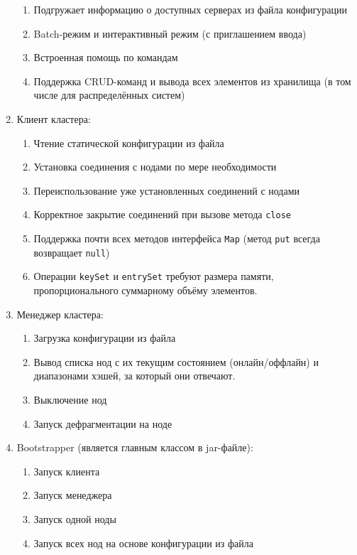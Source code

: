 \documentclass[a4paper]{article}
\renewcommand{\t}{\texttt}
\begin{document}
\begin{enumerate}
    \begin{enumerate}
    \item Подгружает информацию о доступных серверах из файла конфигурации
    \item Batch-режим и интерактивный режим (с приглашением ввода)
    \item Встроенная помощь по командам
    \item Поддержка CRUD-команд и вывода всех элементов из хранилища (в том числе для распределённых систем)
    \end{enumerate}
  \item Клиент кластера:
    \begin{enumerate}
    \item Чтение статической конфигурации из файла
    \item Установка соединения с нодами по мере необходимости
    \item Переиспользование уже установленных соединений с нодами
    \item Корректное закрытие соединений при вызове метода \t{close}
    \item Поддержка почти всех методов интерфейса \t{Map} (метод \t{put} всегда возвращает \t{null})
    \item Операции \t{keySet} и \t{entrySet} требуют размера памяти, пропорционального суммарному объёму
          элементов.
    \end{enumerate}
  \item Менеджер кластера:
    \begin{enumerate}
    \item Загрузка конфигурации из файла
    \item Вывод списка нод с их текущим состоянием (онлайн/оффлайн) и диапазонами хэшей, за который они отвечают.
    \item Выключение нод
    \item Запуск дефрагментации на ноде
    \end{enumerate}
  \item Bootstrapper (является главным классом в jar-файле):
    \begin{enumerate}
    \item Запуск клиента 
    \item Запуск менеджера
    \item Запуск одной ноды
    \item Запуск всех нод на основе конфигурации из файла
    \end{enumerate}
  \end{enumerate}
\end{document}

